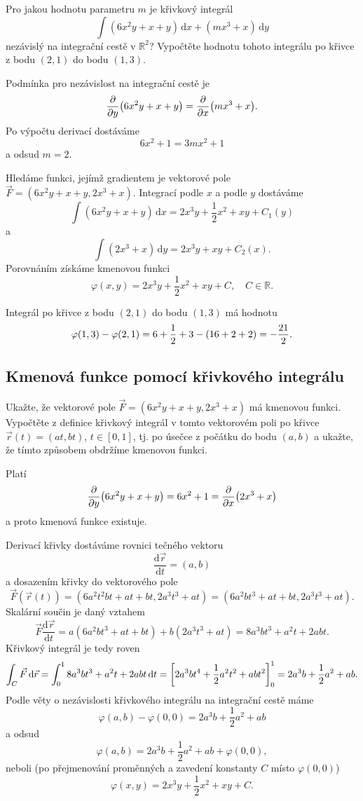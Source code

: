 Pro jakou hodnotu parametru $m$ je křivkový integrál
$$\int (6x^2y+x+y)\,\mathrm dx+(mx^3+x)\,\mathrm dy$$ nezávislý na
integrační cestě v $\mathbb R^2$? Vypočtěte hodnotu tohoto integrálu
po křivce z bodu $(2,1)$ do bodu $(1,3)$.

\reseni

Podmínka pro nezávislost na integrační cestě je $$\pdv{y}\qty(6x^2y+x+y)=\pdv{x}\qty(mx^3+x).$$
Po výpočtu derivací dostáváme
$$6x^2+1=3mx^2+1$$
a odsud $m=2$.

Hledáme funkci, jejímž gradientem je vektorové pole $\vec F=(6x^2y+x+y,2x^3+x)$. 
Integrací podle $x$ a podle $y$ dostáváme
$$\int (6x^2y+x+y)\,\mathrm dx= 2x^3y+\frac 12 x^2+xy+C_1(y) $$
a
$$\int (2x^3+x)\,\mathrm dy=2x^3y+xy+C_2(x).$$
Porovnáním získáme kmenovou funkci
$$\varphi(x,y)=2x^3y+\frac 12 x^2+xy+C,
\quad C
\in
\mathbb R.$$

Integrál po křivce  z bodu $(2,1)$ do bodu $(1,3)$
má hodnotu
$$\varphi(1,3)-\varphi(2,1)=6+\frac 12 +3-\qty(16+2+2)=-\frac{21}2.$$

\konec


\subsection{Kmenová funkce pomocí křivkového integrálu}

Ukažte, že vektorové pole
$\vec F=(6x^2y+x+y,2x^3+x)$ má kmenovou funkci. Vypočtěte z definice křivkový integrál v tomto vektorovém poli po křivce $\vec r(t)=(at,bt)$, $t\in[0,1]$, tj. po úsečce z počátku do bodu $(a,b)$ a ukažte, že tímto způsobem obdržíme kmenovou funkci.  

\reseni
Platí $$\pdv{y}\qty(6x^2y+x+y)=6x^2+1=\pdv{x}\qty(2x^3+x)$$
a proto kmenová funkce existuje.

Derivací křivky dostáváme rovnici tečného vektoru
$$\frac{\mathrm d\vec r}{\mathrm dt}=(a,b)$$
a dosazením křivky do vektorového pole
$$\vec F(\vec r(t))=(6a^2t^2bt+at+bt,2a^3t^3+at)=(6a^2bt^3+at+bt,2a^3t^3+at).$$
Skalární součin je daný vztahem
$$\vec F\frac{\mathrm d\vec r}{\mathrm dt}=a(6a^2bt^3+at+bt)+b(2a^3t^3+at)
=8a^3b t^3+a^2t+2abt.
$$
Křivkový integrál je tedy roven
$$\int_C \vec F\,\mathrm d\vec r=
\int_0^1 8a^3b t^3+a^2t+2abt\,\mathrm dt=
\qty[2a^3bt^4+\frac 12 a^2 t^2+abt^2]_0^1=2a^3b+\frac 12 a^2+ab.
$$
Podle věty o nezávislosti křivkového integrálu na integrační cestě máme
$$\varphi(a,b)-\varphi(0,0)=2a^3b+\frac 12 a^2+ab$$
a odsud
$$\varphi(a,b)=2a^3b+\frac 12 a^2+ab+\varphi(0,0),$$
neboli (po přejmenování proměnných a zavedení konstanty $C$ místo $\varphi(0,0)$)
$$\varphi(x,y)=2x^3y+\frac 12 x^2+xy+C.$$

